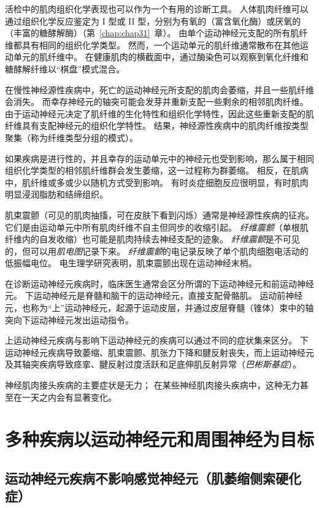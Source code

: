活检中的肌肉组织化学表现也可以作为一个有用的诊断工具。
人体肌肉纤维可以通过组织化学反应鉴定为 I 型或 II 型，分别为有氧的（富含氧化酶）或厌氧的（丰富的糖酵解酶）（第~\ref{chap:chap31}~章）。
由单个运动神经元支配的所有肌纤维都具有相同的组织化学类型。
然而，一个运动单元的肌纤维通常散布在其他运动单元的肌纤维中。
在健康肌肉的横截面中，通过酶染色可以观察到氧化纤维和糖酵解纤维以“棋盘”模式混合。


在慢性神经源性疾病中，死亡的运动神经元所支配的肌肉会萎缩，并且一些肌纤维会消失。
而幸存神经元的轴突可能会发芽并重新支配一些剩余的相邻肌肉纤维。
由于运动神经元决定了肌纤维的生化特性和组织化学特性，因此这些重新支配的肌纤维具有支配神经元的组织化学特性。
结果，神经源性疾病中的肌肉纤维按类型聚集（称为纤维类型分组的模式）。


如果疾病是进行性的，并且幸存的运动单元中的神经元也受到影响，那么属于相同组织化学类型的相邻肌纤维群会发生萎缩，这一过程称为群萎缩。
相反，在肌病中，肌纤维或多或少以随机方式受到影响。
有时炎症细胞反应很明显，有时肌肉明显浸润脂肪和结缔组织。


肌束震颤（可见的肌肉抽搐，可在皮肤下看到闪烁）通常是神经源性疾病的征兆。
它们是由运动单元中所有肌肉纤维不自主但同步的收缩引起。
\textit{纤维震颤}（单根肌纤维内的自发收缩）也可能是肌肉持续去神经支配的迹象。
\textit{纤维震颤}是不可见的，但可以用\textit{肌电图}记录下来。
\textit{纤维震颤}的电记录反映了单个肌肉细胞电活动的低振幅电位。
电生理学研究表明，肌束震颤出现在运动神经末梢。


在诊断运动神经元疾病时，临床医生通常会区分所谓的下运动神经元和前运动神经元。
下运动神经元是脊髓和脑干的运动神经元，直接支配骨骼肌。
运动前神经元，也称为“上”运动神经元，起源于运动皮层，并通过皮层脊髓（锥体）束中的轴突向下运动神经元发出运动指令。


上运动神经元疾病与影响下运动神经元的疾病可以通过不同的症状集来区分。
下运动神经元疾病导致萎缩、肌束震颤、肌张力下降和腱反射丧失，而上运动神经元及其轴突疾病导致痉挛、腱反射过度活跃和足底伸肌反射异常（\textit{巴彬斯基症}）。


神经肌肉接头疾病的主要症状是无力；
在某些神经肌肉接头疾病中，这种无力甚至在一天之内会有显著变化。



\section{多种疾病以运动神经元和周围神经为目标}

\subsection{运动神经元疾病不影响感觉神经元（肌萎缩侧索硬化症）}

